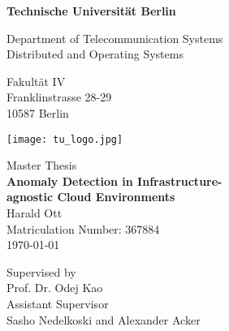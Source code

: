 \thispagestyle{empty}
\begin{center}

\vspace*{1.4cm}
{\LARGE \textbf{Technische Universit\"at Berlin}}

\vspace{0.5cm}

{\large Department of Telecommunication Systems\\[1mm]}
{\large Distributed and Operating Systems\\[5mm]}

Fakult\"at IV\\
Franklinstrasse 28-29\\
10587 Berlin\\

\vspace*{1cm}

\texttt{[image: tu\_logo.jpg]}

\vspace*{1.0cm}

{\LARGE Master Thesis}\\

\vspace{1.0cm}
{\LARGE \textbf{Anomaly Detection in Infrastructure-}}\\
\vspace*{0.3cm}
{\LARGE \textbf{agnostic Cloud Environments}}\\
\vspace*{1.0cm}
{\LARGE Harald Ott}
\\
\vspace*{0.5cm}
Matriculation Number: 367884\\
\today\\ %
\vspace*{1.0cm}

Supervised by\\
Prof. Dr. Odej Kao\\
\vspace*{0.5cm}
Assistant Supervisor\\
Sasho Nedelkoski and Alexander Acker
\vspace{3cm}


\end{center}

